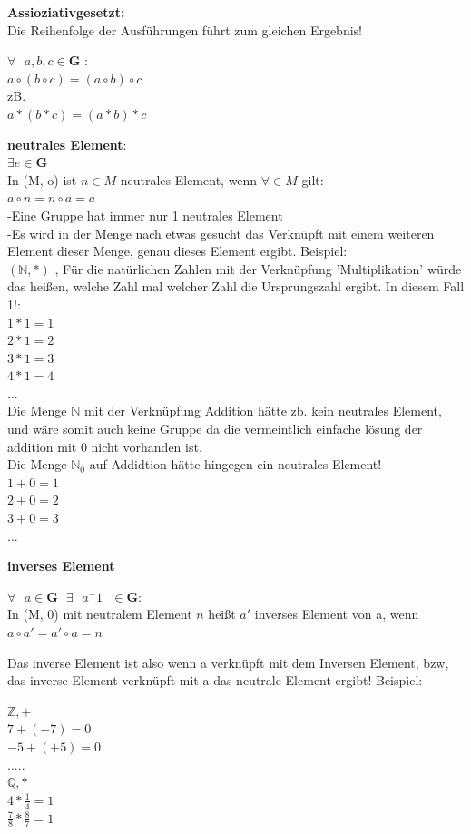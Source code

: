 \documentclass[a4paper,12pt]{scrartcl}
\begin{document}
\textbf{Assioziativgesetzt:}\\
Die Reihenfolge der Ausführungen führt zum gleichen Ergebnis!
\begin{center}
$\forall \text{  }  a, b, c \in \textbf{G}$ :\\
 $a \circ (b\circ c) = (a \circ b) \circ c$\\
 zB.\\
$a * (b *c) = (a * b) * c$
\end{center}
\begin{center}\textbf{neutrales Element}:\\
$\exists e \in \textbf{G}$ \\

In (M, o) ist $n \in M$ neutrales Element, wenn $\forall \in M$ gilt:\\
$a \circ n = n \circ a = a$\\
 -Eine Gruppe hat immer nur 1 neutrales Element\\
 -Es wird in der Menge nach etwas gesucht das Verknüpft mit einem weiteren Element dieser Menge, genau dieses Element ergibt.
 Beispiel:\\
 $(\mathbb{N, *})$ , Für die natürlichen Zahlen mit der Verknüpfung 'Multiplikation' würde das heißen, welche Zahl mal welcher Zahl die Ursprungszahl ergibt. In diesem Fall 1!:\\
 $1 * 1 = 1$\\
 $2 * 1 = 2$\\
 $3 * 1 = 3$\\
 $4 * 1 = 4$\\
 $...$\\
 Die Menge $\mathbb{N}$ mit der Verknüpfung Addition hätte zb. kein neutrales Element, und wäre somit auch keine Gruppe da die vermeintlich einfache lösung der addition mit $0$ nicht vorhanden ist.\\
 Die Menge $\mathbb{N}_{0}$ auf Addidtion hätte hingegen ein neutrales Element!\\
 $1 + 0 = 1$\\
 $2 + 0 = 2$\\
 $3 + 0 = 3$\\
 $ ...   $
 
 
 
\end{center}
\textbf{inverses Element}
\begin{center}
$\forall \text{  } a \in \textbf{G} \text{ } \exists \text{ } a^-1 \text{ } \in \textbf{G}$:\\
 In (M, 0) mit neutralem Element $n$ heißt $a'$ inverses Element von a, wenn $a \circ a' = a' \circ a = n$
\end{center}
Das inverse Element ist also wenn a verknüpft mit dem Inversen Element, bzw, das inverse Element verknüpft mit a das neutrale Element ergibt!
Beispiel:
\begin{center}
 $\mathbb{Z, +}$\\
$7 + (-7) = 0$\\
$-5 + (+5) = 0$\\
$ .....$
\\ 
$\mathbb{Q, *}$\\
$4 * \frac{1}{4} = 1$\\
$\frac{7}{8} * \frac{8}{7} = 1$
\end{center}
\end{document}
